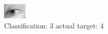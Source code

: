 \begin{figure}[h!]
\begin{center}
\includegraphics[width=0.60\columnwidth]{figures/ID2890_class_3_target_4.png}
\end{center}
\caption{ Classification: 3 actual target: 4}
\label{fig:ID2890_class_3_target_4}
\end{figure}
